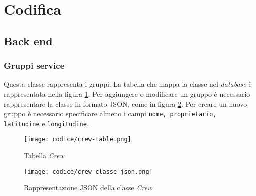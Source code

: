 \section{Codifica}
\subsection{Back end}
\subsubsection{Gruppi service}
\label{par:Crew}
Questa classe rappresenta i gruppi. La tabella che mappa la classe nel \textit{database} è rappresentata nella figura \ref{img:Crew-tabella}. Per aggiungere o modificare un gruppo è necessario rappresentare la classe in formato JSON, come in figura \ref{img:Crew-classe-json}. Per creare un nuovo gruppo è necessario specificare almeno i campi \texttt{nome, proprietario, latitudine} e \texttt{longitudine}. 


\begin{figure}[H]
    \centerline{\texttt{[image: codice/crew-table.png]}}
    \caption{Tabella \textit{Crew}}
    \label{img:Crew-tabella}
\end{figure}

\begin{figure}[H]
    \centerline{\texttt{[image: codice/crew-classe-json.png]}}
    \caption{Rappresentazione JSON della classe \textit{Crew}}
    \label{img:Crew-classe-json}
\end{figure}


